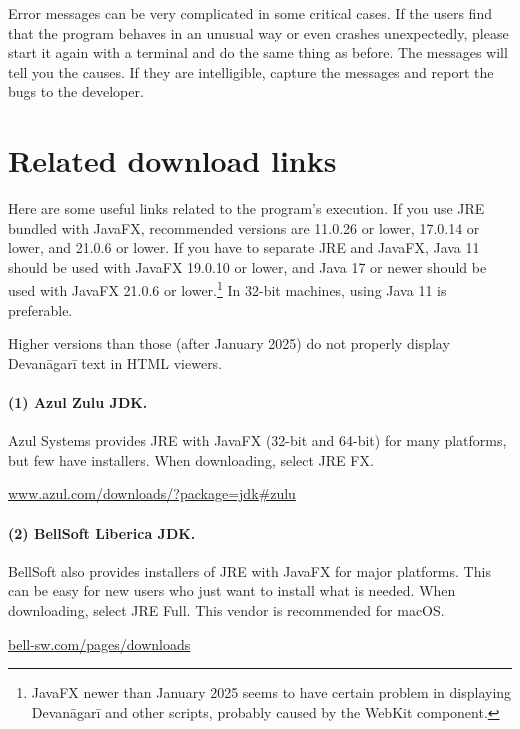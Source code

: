 Error messages can be very complicated in some critical cases. If the users find that the program behaves in an unusual way or even crashes unexpectedly, please start it again with a terminal and do the same thing as before. The messages will tell you the causes. If they are intelligible, capture the messages and report the bugs to the developer.

\section{Related download links}

Here are some useful links related to the program's execution. If you use JRE bundled with JavaFX, recommended versions are 11.0.26 or lower, 17.0.14 or lower, and 21.0.6 or lower. If you have to separate JRE and JavaFX, Java 11 should be used with JavaFX 19.0.10 or lower, and Java 17 or newer should be used with JavaFX 21.0.6 or lower.\footnote{JavaFX newer than January 2025 seems to have certain problem in displaying Devanāgarī and other scripts, probably caused by the WebKit component.} In 32-bit machines, using Java 11 is preferable.


Higher versions than those (after January 2025) do not properly display Devanāgarī text in HTML viewers. 

\paragraph{(1) Azul Zulu JDK.} Azul Systems provides JRE with JavaFX (32-bit and 64-bit) for many platforms, but few have installers. When downloading, select JRE FX.

\begin{compactitem}
\item \url{www.azul.com/downloads/?package=jdk#zulu}
\end{compactitem}

\paragraph{(2) BellSoft Liberica JDK.} BellSoft also provides installers of JRE with JavaFX for major platforms. This can be easy for new users who just want to install what is needed. When downloading, select JRE Full. This vendor is recommended for macOS.

\begin{compactitem}
\item \url{bell-sw.com/pages/downloads}
\end{compactitem}

